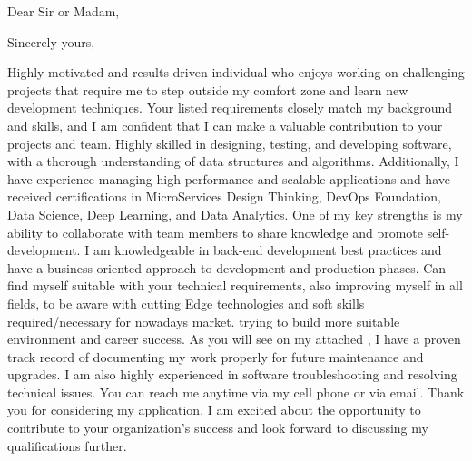 \documentclass{subfiles}
\begin{document}
\clearpage
{} %
\date{\today} %
\opening{Dear Sir or Madam,} %
\closing{Sincerely yours,} %

\makelettertitle %

Highly motivated and results-driven individual who enjoys working on challenging projects that require me to step outside my comfort zone and learn new development techniques.
Your listed requirements closely match my background and skills, and I am confident that I can make a valuable contribution to your projects and team.
\newline
Highly skilled in designing, testing, and developing software, with a thorough understanding of data structures and algorithms.
Additionally, I have experience managing high-performance and scalable applications and have received certifications in MicroServices Design Thinking, DevOps Foundation, Data Science, Deep Learning, and Data Analytics.
\newline
One of my key strengths is my ability to collaborate with team members to share knowledge and promote self-development.
I am knowledgeable in back-end development best practices and have a business-oriented approach to development and production phases.
Can find myself suitable with your technical requirements, also improving myself in all fields, 
to be aware with cutting Edge technologies and soft skills required/necessary for nowadays market. 
trying to build more suitable environment and career success.
\newline
As you will see on my attached ,
I have a proven track record of documenting my work properly for future maintenance and upgrades. I am also highly experienced in software troubleshooting and resolving technical issues.
\newline
You can reach me anytime via my cell phone or via email.
Thank you for considering my application. I am excited about the opportunity to contribute to your organization's success and look forward to discussing my qualifications further.

\makeletterclosing %

\newpage
\end{document}
